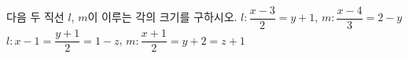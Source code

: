 다음 두 직선 $l$, $m$이 이루는 각의 크기를 구하시오.
 $l\colon \dfrac{x-3}{2}=y+1$, $m\colon \dfrac{x-4}{3}=2-y$
 $l\colon x-1=\dfrac{y+1}{2}=1-z$, $m\colon \dfrac{x+1}{2}=y+2=z+1$
